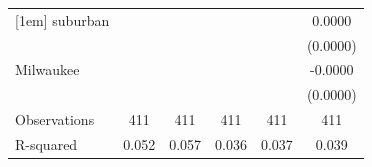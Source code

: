 {\begin{tabular}{l*{5}{c}}
[1em]
suburban            &                     &                     &                     &                     &      0.0000         \\
                    &                     &                     &                     &                     &    (0.0000)         \\
[1em]
Milwaukee           &                     &                     &                     &                     &     -0.0000\sym{**} \\
                    &                     &                     &                     &                     &    (0.0000)         \\
\hline
Observations        &         411         &         411         &         411         &         411         &         411         \\
R-squared           &       0.052         &       0.057         &       0.036         &       0.037         &       0.039         \\
\hline\hline
\end{tabular}
}
